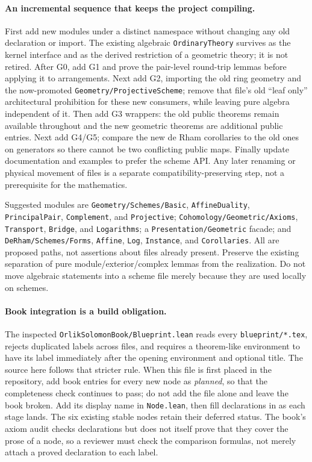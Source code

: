 \documentclass[11pt]{article}
\newcommand{\planned}[1]{\texttt{\detokenize{#1}}}
\theoremstyle{definition}
\theoremstyle{remark}
\renewcommand{\planned}[1]{\nolinkurl{#1}}
\begin{document}
\paragraph{An incremental sequence that keeps the project compiling.}
First add new modules under a distinct namespace without changing any old declaration or import. The existing algebraic \planned{OrdinaryTheory} survives as the kernel interface and as the derived restriction of a geometric theory; it is not retired. After G0, add G1 and prove the pair-level round-trip lemmas before applying it to arrangements. Next add G2, importing the old ring geometry and the now-promoted \planned{Geometry/ProjectiveScheme}; remove that file's old ``leaf only'' architectural prohibition for these new consumers, while leaving pure algebra independent of it. Then add G3 wrappers: the old public theorems remain available throughout and the new geometric theorems are additional public entries. Next add G4/G5; compare the new de Rham corollaries to the old ones on generators so there cannot be two conflicting public maps. Finally update documentation and examples to prefer the scheme API. Any later renaming or physical movement of files is a separate compatibility-preserving step, not a prerequisite for the mathematics.

Suggested modules are \planned{Geometry/Schemes/Basic}, \planned{AffineDuality}, \planned{PrincipalPair}, \planned{Complement}, and \planned{Projective}; \planned{Cohomology/Geometric/Axioms}, \planned{Transport}, \planned{Bridge}, and \planned{Logarithms}; a \planned{Presentation/Geometric} facade; and \planned{DeRham/Schemes/Forms}, \planned{Affine}, \planned{Log}, \planned{Instance}, and \planned{Corollaries}. All are proposed paths, not assertions about files already present. Preserve the existing separation of pure module/exterior/complex lemmas from the realization. Do not move algebraic statements into a scheme file merely because they are used locally on schemes.

\paragraph{Book integration is a build obligation.}
The inspected \planned{OrlikSolomonBook/Blueprint.lean} reads every \planned{blueprint/*.tex}, rejects duplicated labels across files, and requires a theorem-like environment to have its label immediately after the opening environment and optional title. The source here follows that stricter rule. When this file is first placed in the repository, add book entries for every new node as \emph{planned}, so that the completeness check continues to pass; do not add the file alone and leave the book broken. Add its display name in \planned{Node.lean}, then fill declarations in as each stage lands. The six existing stable nodes retain their deferred status. The book's axiom audit checks declarations but does not itself prove that they cover the prose of a node, so a reviewer must check the comparison formulas, not merely attach a proved declaration to each label.
\end{document}
